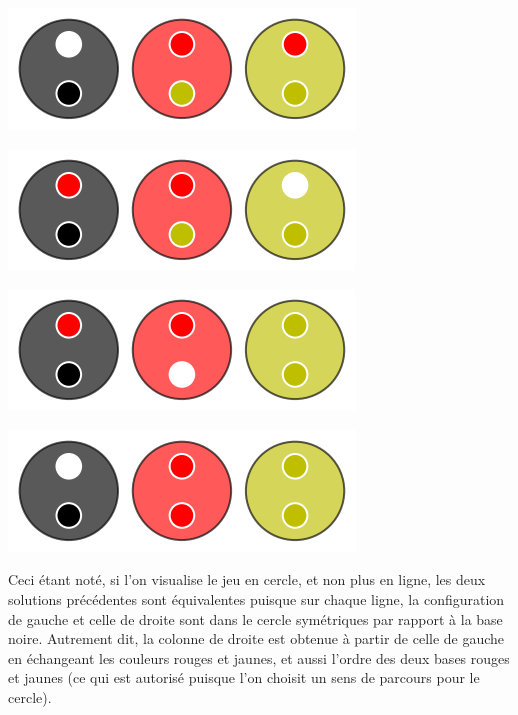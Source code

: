 \begin{multicols}{2}
	\columnbreak
	\begin{center}   %
		\includegraphics[scale=0.25]{content/optimal/tree_sol/no_unicity/sol_1/000.png}

		\includegraphics[scale=0.25]{content/optimal/tree_sol/no_unicity/sol_2/001.png}

		\includegraphics[scale=0.25]{content/optimal/tree_sol/no_unicity/sol_2/002.png}

		\includegraphics[scale=0.25]{content/optimal/tree_sol/no_unicity/sol_1/003.png}
	\end{center}
\end{multicols}

Ceci étant noté, si l'on visualise le jeu en cercle, et non plus en ligne, les deux solutions précédentes sont équivalentes puisque sur chaque ligne, la configuration de gauche et celle de droite sont dans le cercle symétriques par rapport à la base noire.
Autrement dit, la colonne de droite est obtenue à partir de celle de gauche en échangeant les couleurs rouges et jaunes, et aussi l'ordre des deux bases rouges et jaunes (ce qui est autorisé puisque l'on choisit un sens de parcours pour  le cercle).

